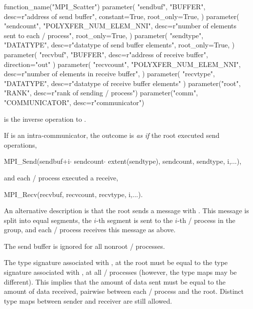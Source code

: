 \begin{mpi-binding}
    function_name("MPI_Scatter")
    parameter(
        "sendbuf",
        "BUFFER",
        desc=r"address of send buffer",
        constant=True,
        root_only=True,
    )
    parameter(
        "sendcount",
        "POLYXFER_NUM_ELEM_NNI",
        desc=r"number of elements sent to each \MPI/ process",
        root_only=True,
    )
    parameter(
        "sendtype",
        "DATATYPE",
        desc=r"datatype of send buffer elements",
        root_only=True,
    )
    parameter(
        "recvbuf", "BUFFER", desc=r"address of receive buffer", direction="out"
    )
    parameter(
        "recvcount",
        "POLYXFER_NUM_ELEM_NNI",
        desc=r"number of elements in receive buffer",
    )
    parameter(
        "recvtype", "DATATYPE", desc=r"datatype of receive buffer elements"
    )
    parameter("root", "RANK", desc=r"rank of sending \MPI/ process")
    parameter("comm", "COMMUNICATOR", desc=r"communicator")
\end{mpi-binding}

 is the inverse operation to .

If  is an intra-communicator,
the outcome is \emph{as if} the root executed  send operations,
\begin{mpicodeblock}
MPI\_Send(sendbuf+i$\cdot$ sendcount$\cdot$ extent(sendtype), sendcount,
sendtype, i,...),
\end{mpicodeblock}
\noindent and each \MPI/ process executed a receive,
\begin{mpicodeblock}
MPI\_Recv(recvbuf, recvcount, recvtype, i,...).
\end{mpicodeblock}

An alternative description is that the root sends a message with
. This
message is split into  equal segments, the
$i$-th
segment is
sent to the
$i$-th
\MPI/ process in the group, and each \MPI/ process receives
this message as above.

The send buffer is ignored for all nonroot \MPI/ processes.

The type signature associated with ,  at the root
must be equal to the type signature associated with
,  at all
\MPI/ processes (however, the type maps may be different).
This implies that the amount of data sent must be equal to the
amount of data received, pairwise between each \MPI/ process and the root.
Distinct type maps between sender and receiver are still allowed.

